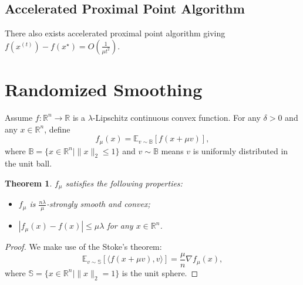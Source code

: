 \documentclass[openany]{book}
\newtheorem{theorem}{Theorem}[chapter]
\theoremstyle{definition}
\theoremstyle{remark}
\begin{document}
\subsection{Accelerated Proximal Point Algorithm}
There also exists accelerated proximal point algorithm giving $f(x^{(t)})-f(x^{\star})=O\left(\frac{1}{\mu t^2}\right)$.

\section{Randomized Smoothing}
Assume $f:\mathbb{R}^n\to \mathbb{R}$ is a $\lambda$-Lipschitz continuous convex function. For any $\delta>0$ and any $x\in \mathbb{R}^n$, define
\begin{equation}
    f_{\mu}(x)=\mathbb{E}_{v\sim \mathbb{B}}[f(x+\mu v)],
\end{equation}
where $\mathbb{B}=\{x\in \mathbb{R}^n|\|x\|_2\le1\}$ and $v\sim \mathbb{B}$ means $v$ is uniformly distributed in the unit ball.

\begin{theorem}
    $f_{\mu}$ satisfies the following properties:
    \begin{itemize}
        \item $f_{\mu}$ is $\frac{n\lambda}{\mu}$-strongly smooth and convex;
        \item $|f_{\mu}(x)-f(x)|\le\mu\lambda$ for any $x\in \mathbb{R}^n$.
    \end{itemize}
\end{theorem}
\begin{proof}
    We make use of the Stoke's theorem:
    \begin{equation}
        \mathbb{E}_{v\sim \mathbb{S}}[\langle f(x+\mu v),v\rangle]=\frac{\mu}{n}\nabla f_{\mu}(x),
    \end{equation}
    where $\mathbb{S}=\{x\in \mathbb{R}^n|\|x\|_2=1\}$ is the unit sphere.
\end{proof}
\end{document}
